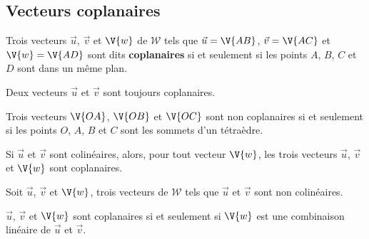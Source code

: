 \subsection{Vecteurs coplanaires}
\begin{definition}
Trois vecteurs $\vec{u}$, $\vec{v}$ et $\V{w}$ de $\mathcal{W}$ tels que $\vec{u}=\V{AB}$, $\vec{v}=\V{AC}$ et $\V{w}=\V{AD}$ sont dits \textbf{coplanaires} si et seulement si les points $A$, $B$, $C$ et $D$ sont dans un même plan.
\end{definition}
\begin{remark}
 Deux vecteurs $\vec{u}$ et $\vec{v}$ sont toujours coplanaires.
\par {} Trois vecteurs $\V{OA}$, $\V{OB}$ et $\V{OC}$ sont non coplanaires si et seulement si les points $O$, $A$, $B$ et $C$ sont les sommets d'un tétraèdre.
\par {} Si $\vec{u}$ et $\vec{v}$ sont colinéaires, alors, pour tout vecteur $\V{w}$, les trois vecteurs $\vec{u}$, $\vec{v}$ et $\V{w}$ sont coplanaires.
\end{remark}
\begin{propriete}
		 Soit $\vec{u}$, $\vec{v}$ et $\V{w}$, trois vecteurs de $\mathcal{W}$ tels que $\vec{u}$ et $\vec{v}$ sont non colinéaires.
		\par $\vec{u}$, $\vec{v}$ et $\V{w}$ sont coplanaires si et seulement si $\V{w}$ est une combinaison linéaire de $\vec{u}$ et $\vec{v}$.
\end{propriete}
